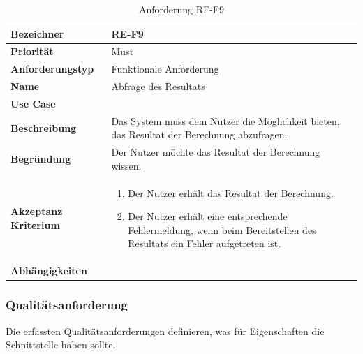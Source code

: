 \begin{table}[ht]
\centering
  \begin{tabular}{ l | p{8cm} }
	\hline
	\rowcolor{gray}
	\textbf{Bezeichner}&	\textbf{RE-F9}\\ \hline
	\textbf{Priorität} 		&	Must\\ \hline
	\textbf{Anforderungstyp}	&	Funktionale Anforderung\\ \hline
	\textbf{Name} 			&	Abfrage des Resultats\\ \hline
	\textbf{Use Case} 		&	\nameref{table:use_case_6}\\ \hline
	\textbf{Beschreibung} 	&	Das System muss dem Nutzer die Möglichkeit bieten, das Resultat der Berechnung abzufragen.\\ \hline
	\textbf{Begründung} 		&	Der Nutzer möchte das Resultat der Berechnung wissen.\\ \hline
	\textbf{Akzeptanz Kriterium}	&	\begin{enumerate}
					\item Der Nutzer erhält das Resultat der Berechnung.
					\item Der Nutzer erhält eine entsprechende Fehlermeldung, wenn beim Bereitstellen des Resultats ein Fehler aufgetreten ist.
					\end{enumerate}
					\\ \hline
	\textbf{Abhängigkeiten} 	&	\nameref{table:req_2}\\ \hline
  \end{tabular}
   \caption{Anforderung RF-F9}\label{table:req_9}
\end{table}

\newpage
\FloatBarrier
\subsubsection{Qualitätsanforderung}\label{non_func_anforderungen}
Die erfassten Qualitätsanforderungen definieren, was für Eigenschaften die Schnittstelle haben sollte.

